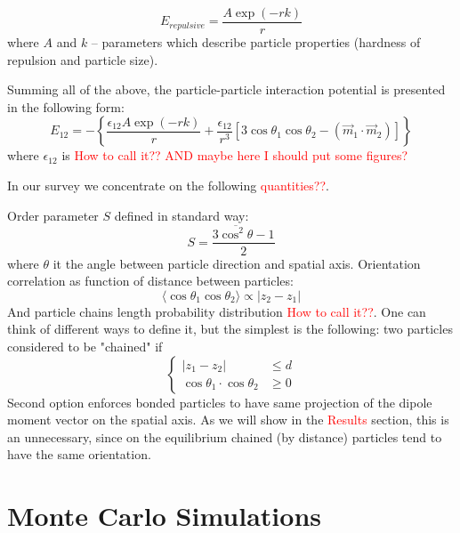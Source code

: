 \documentclass[12pt,a4paper]{article}
\begin{document}
\label{eq_yukawa_interaction}
\begin{equation}
E_{repulsive} = \frac{A \exp(-r k)}{r}
\end{equation}
where $A$ and $k$ -- parameters which describe particle properties (hardness of repulsion and particle size).

Summing all of the above, the particle-particle interaction potential is presented in the following form:
\label{eq_full_particle_particle_interraction}
\begin{equation}
E_{12} = -\left\{ \frac{\epsilon_{12} A \exp(-r k)}{r} +  \frac{\epsilon_{12}}{r^3} [3 \cos \theta_1 \cos \theta_2 - (\vec{m}_1 \cdot \vec{m}_2)]\right\}
\end{equation}
where $\epsilon_{12}$ is \textcolor{red}{How to call it?? AND maybe here I should put some figures?}

In our survey we concentrate on the following \textcolor{red}{quantities??}.

Order parameter $S$ defined in standard way:
\begin{equation}
S = \frac{3 \overline{\cos^2 \theta} - 1}{2}
\end{equation}
where $\theta$ it the angle between particle direction and spatial axis.
Orientation correlation as function of distance between particles:
\begin{equation}
\langle\cos \theta_1 \cos \theta_2\rangle \propto |z_2 - z_1|
\end{equation}
And particle chains length probability distribution \textcolor{red}{How to call it??}. One can think of different ways to define it, but the simplest is the following:  two particles considered to be "chained" if 
\begin{equation}
\begin{cases}
	|z_1 - z_2| &\leq d\\
	\cos \theta_1 \cdot \cos \theta_2 &\geq 0
\end{cases}
\end{equation}
Second option enforces bonded particles to have same projection of the dipole moment vector on the spatial axis. As we will show in the \textcolor{red}{Results} section, this is an unnecessary, since on the equilibrium chained (by distance) particles tend to have the same orientation.

\section{Monte Carlo Simulations}
\end{document}
